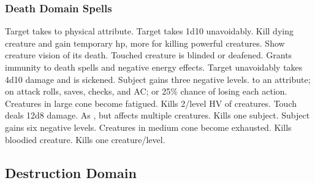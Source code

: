 \subsubsection{Death Domain Spells}
\begin{spelllist}
   Target takes  to physical attribute.
   Target takes 1d10 unavoidably.
   Kill dying creature and gain temporary hp, more for killing powerful creatures.
   Show creature vision of its death.
   Touched creature is blinded or deafened.
   Grants immunity to death spells and negative energy effects.
   Target unavoidably takes 4d10 damage and is sickened.
   Subject gains three negative levels.
    to an attribute;  on attack rolls, saves, checks, and AC; or 25\% chance of losing each action.
   Creatures in large cone become fatigued.
  \M Kills 2/level HV of creatures.
   Touch deals 12d8 damage.
   As , but affects multiple creatures.
   Kills one subject.
   Subject gains six negative levels.
   Creatures in medium cone become exhausted.
   Kills bloodied creature.
   Kills one creature/level.
\end{spelllist}

\subsection{Destruction Domain}

